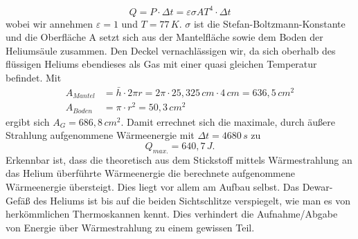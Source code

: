 \documentclass[twoside,colorback,accentcolor=tud4c,11pt]{tudreport}
\begin{document}
\begin{equation}
Q=P\cdot\Delta t=\varepsilon\sigma A T^4\cdot\Delta t
\end{equation}
wobei wir annehmen $\varepsilon=1$ und $T=77\,\si{K}$. $\sigma$ ist die Stefan-Boltzmann-Konstante und die Oberfläche A setzt sich aus der Mantelfläche sowie dem Boden der Heliumsäule zusammen. Den Deckel vernachlässigen wir, da sich oberhalb des flüssigen Heliums ebendieses als Gas mit einer quasi gleichen Temperatur befindet. Mit
\begin{align}
A_{Mantel}&=\bar{h}\cdot 2\pi r=2\pi\cdot 25,325\,\si{cm}\cdot 4\,\si{cm}=636,5\,\si{cm^2}\\
A_{Boden}&=\pi\cdot r^2=50,3\,\si{cm^2}
\end{align}
ergibt sich $A_{G}=686,8\,\si{cm^2}$. Damit errechnet sich die maximale, durch äußere Strahlung aufgenommene Wärmeenergie mit $\Delta t=4680\,\si{s}$  zu
\begin{equation}
Q_{max.}=640,7\,\si{J}.
\end{equation}
Erkennbar ist, dass die theoretisch aus dem Stickstoff mittels Wärmestrahlung an das Helium überführte Wärmeenergie die berechnete aufgenommene Wärmeenergie übersteigt. Dies liegt vor allem am Aufbau selbst. Das Dewar-Gefäß des Heliums ist bis auf die beiden Sichtschlitze verspiegelt, wie man es von herkömmlichen Thermoskannen kennt. Dies verhindert die Aufnahme/Abgabe von Energie über Wärmestrahlung zu einem gewissen Teil.
\end{document}
